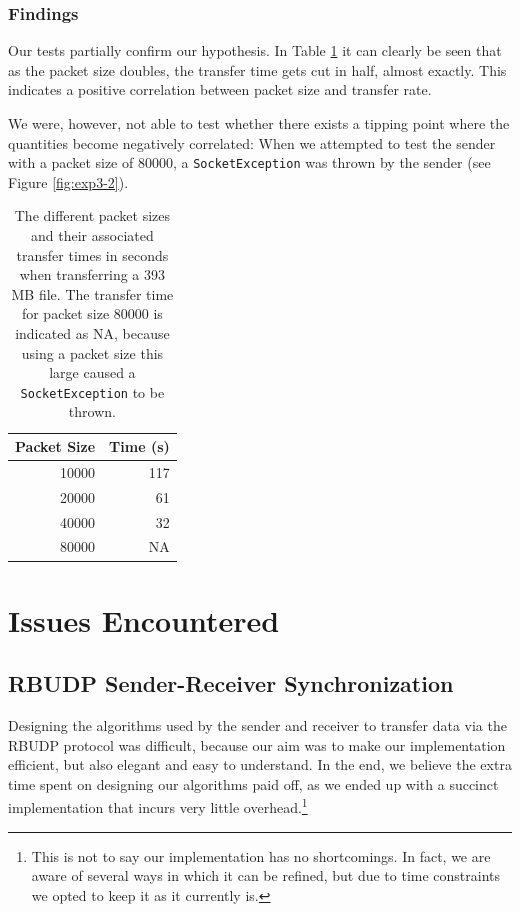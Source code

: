 \documentclass[10pt, a4paper]{article}
\begin{document}
\subsubsection{Findings}
\label{subsubsec:findings-3}

Our tests partially confirm our hypothesis. In Table \ref{tab:packet-time} it
can clearly be seen that as the packet size doubles, the transfer time gets cut
in half, almost exactly. This indicates a positive correlation between packet
size and transfer rate.

We were, however, not able to test whether there exists a
tipping point where the quantities become negatively correlated: When we
attempted to test the sender with a packet size of 80000, a
\texttt{SocketException} was thrown by the sender (see Figure \ref{fig:exp3-2}).

\begin{table}
  \centering
  \begin{tabular}{@{}rr@{}}
    \toprule
    Packet Size & Time (s) \\
    \midrule
    10000 & 117 \\
    20000 & 61 \\
    40000 & 32 \\
    80000 & NA \\
    \bottomrule
  \end{tabular}
  \caption{The different packet sizes and their associated transfer times in
  seconds when transferring a 393 MB file. The transfer time for packet size
  80000 is indicated as NA, because using a packet size this large caused a
  \texttt{SocketException} to be thrown.}
  \label{tab:packet-time}

\end{table}


\section{Issues Encountered}
\label{sec:issues}

\subsection{RBUDP Sender-Receiver Synchronization}
\label{subsec:send-recv-sync}

Designing the algorithms used by the sender and receiver to transfer data via
the RBUDP protocol was difficult, because our aim was to make our implementation
efficient, but also elegant and easy to understand. In the end, we believe the
extra time spent on designing our algorithms paid off, as we ended up with a
succinct implementation that incurs very little overhead.\footnote{This is not
to say our implementation has no shortcomings. In fact, we are aware of several
ways in which it can be refined, but due to time constraints we opted to keep
it as it currently is.}
\end{document}
